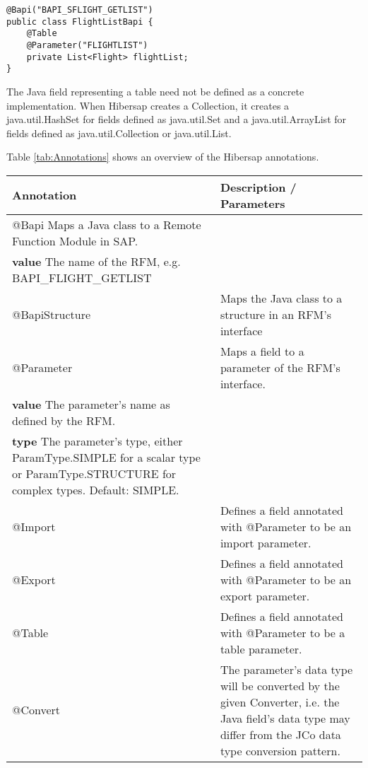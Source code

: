 \begin{Verbatim}[frame=single]
@Bapi("BAPI_SFLIGHT_GETLIST") 
public class FlightListBapi {
    @Table 
    @Parameter("FLIGHTLIST") 
    private List<Flight> flightList;
}
\end{Verbatim}

The Java field representing a table need not be defined as a concrete implementation. When Hibersap creates a Collection, it creates a java.util.HashSet for fields defined as java.util.Set and a java.util.ArrayList for fields defined as java.util.Collection or java.util.List.

Table \ref{tab:Annotations} shows an overview of the Hibersap annotations.

\begin{table}[H]
  \centering
   \begin{tabularx}{\textwidth}{ l X }
    \toprule 
    \textbf{Annotation}     & \textbf{Description / Parameters} \\ 
    \midrule
    @Bapi                     Maps a Java class to a Remote Function Module in SAP.\\
                              \textbf{value} The name of the RFM, e.g. BAPI\_FLIGHT\_GETLIST\\ 
    @BapiStructure          & Maps the Java class to a structure in an RFM's interface \\
    @Parameter              & Maps a field to a parameter of the RFM's interface.\\
                              \textbf{value} The parameter's name as defined by the RFM. \\
                              \textbf{type} The parameter's type, either ParamType.SIMPLE for a 
                                            scalar type or ParamType.STRUCTURE for complex types. 
                                            Default: SIMPLE. \\
    @Import                 & Defines a field annotated with @Parameter to be an import parameter. \\
    @Export                 & Defines a field annotated with @Parameter to be an export parameter. \\
    @Table                  & Defines a field annotated with @Parameter to be a table parameter. \\
    @Convert                & The parameter's data type will be converted by the given Converter, 
                              i.e. the Java field's data type may differ from 
                              the JCo data type conversion pattern.\\

\end{tabularx}
\end{table}

